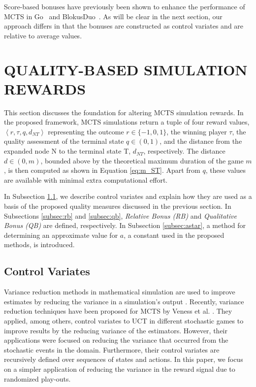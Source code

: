 \documentclass{ecai2014}
\newcommand{\tuple}[1]{\ensuremath{\left \langle #1 \right \rangle }}
\newcommand{\node}[1]{{\fontfamily{phv}\selectfont#1}}
\begin{document}
Score-based bonuses have previously been shown to enhance the performance of MCTS in Go~\cite{Enzenberger10Fuego} and  BlokusDuo~\cite{shibahara2008combining}. As will be clear in the next section, our approach differs in that the bonuses are constructed as control variates and are relative to average values. 

\section{QUALITY-BASED SIMULATION REWARDS}
\label{sec:qoreward}
This section discusses the foundation for altering MCTS simulation rewards. In the proposed framework, MCTS simulations return a tuple of four reward values, $\tuple{r,\tau,q,d_{NT}}$ representing the outcome $r\in\{-1, 0, 1\}$, the winning player $\tau$, the quality assessment of the terminal state $q\in(0, 1)$, and the distance from the expanded node \node{N} to the terminal state \node{T}, $d_{NT}$, respectively. The distance $d\in(0, m)$, bounded above by the theoretical maximum duration of the game $m$, is then computed as shown in Equation \ref{eq:m_ST}. Apart from $q$, these values are available with minimal extra computational effort.

In Subsection \ref{sub:cv}, we describe control variates and explain how they are used as a basis of the proposed quality measures discussed in the previous section. In Subsections \ref{subsec:rb} and \ref{subsec:qb}, \emph{Relative Bonus (RB)} and \emph{Qualitative Bonus (QB)} are defined, respectively. In Subsection \ref{subsec:astar}, a method for determining an approximate value for $a$, a constant used in the proposed methods, is introduced.

\subsection{Control Variates}
\label{sub:cv}
Variance reduction methods in mathematical simulation are used to improve estimates by reducing the variance in a simulation's output \cite{kelton2000simulation}. Recently, variance reduction techniques have been proposed for MCTS by Veness et al. \cite{Veness11variance}. They applied, among others, control variates to UCT in different stochastic games to improve results by the reducing variance of the estimators. However, their applications were focused on reducing the variance that occurred from the stochastic events in the domain. Furthermore, their control variates are recursively defined over sequences of states and actions. In this paper, we focus on a simpler application of reducing the variance in the reward signal due to randomized play-outs.  
\end{document}
